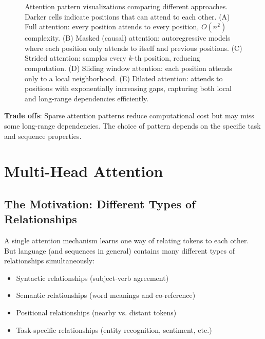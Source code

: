 \begin{figure}[h!]
  \caption{Attention pattern visualizations comparing different approaches. Darker cells indicate positions that can attend to each other. (A) Full attention: every position attends to every position, $O(n^2)$ complexity. (B) Masked (causal) attention: autoregressive models where each position only attends to itself and previous positions. (C) Strided attention: samples every $k$-th position, reducing computation. (D) Sliding window attention: each position attends only to a local neighborhood. (E) Dilated attention: attends to positions with exponentially increasing gaps, capturing both local and long-range dependencies efficiently.}
\end{figure}

\textbf{Trade offs}: Sparse attention patterns reduce computational cost but may miss some long-range dependencies. The choice of pattern depends on the specific task and sequence properties.

\section{Multi-Head Attention}

\subsection{The Motivation: Different Types of Relationships}

A single attention mechanism learns one way of relating tokens to each other. But language (and sequences in general) contains many different types of relationships simultaneously:
\begin{itemize}
  \item Syntactic relationships (subject-verb agreement)
  \item Semantic relationships (word meanings and co-reference)
  \item Positional relationships (nearby vs. distant tokens)
  \item Task-specific relationships (entity recognition, sentiment, etc.)
\end{itemize}

